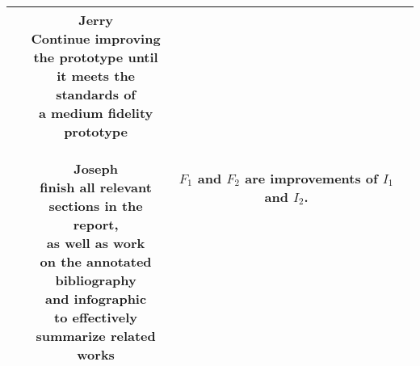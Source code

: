 \documentclass[12pt]{article}
\begin{document}
\begin{tabular}{|c|c|c|c|}
     & \makecell{
        \textbf{Jerry}\\ 
        Continue improving\\ the prototype until\\ it meets the\\ standards of\\ a medium fidelity \\prototype\\
        \\
        \textbf{Joseph}\\
        finish all relevant\\ sections in the report, \\
         as well as work\\ on the annotated\\ 
         bibliography\\ and infographic\\ to
         effectively \\summarize related works
     } 
     
     &\makecell{
       $F_1$ and $F_2$ are\\ improvements of\\ $I_1$ and $I_2$.
    } \\
     \hline
\end{tabular}
\end{document}
